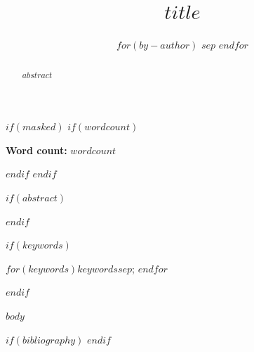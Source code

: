 \documentclass[
    a4paper,
    man,
    floatsintext
]{glossaPX2}
\title[$shorttitle$]{$title$}
\author[]{}%
\author[$if(shortauthor)$$shortauthor$$endif$]{
  $for(by-author)$
  \spauthor{
  $by-author.name.literal$\\
  $if(by-author.affiliations)$
    $for(by-author.affiliations)$
      \institute{$by-author.affiliations.name$}\\
    $endfor$
  $endif$
  $if(by-author.email)$
    \small{$by-author.email$\\}
  $endif$
  $if(by-author.orcid)$
    \small{ORCID: $by-author.orcid$}
  $endif$
  }
  $sep$ \AND
  $endfor$
  }
\begin{document}
\maketitle

$if(masked)$
  $if(wordcount)$
\begin{center}
\textbf{Word count:} $wordcount$
\end{center}
  $endif$
$endif$

$if(abstract)$
\begin{abstract}
$abstract$
\end{abstract}
$endif$

$if(keywords)$
\begin{keywords}
$for(keywords)$$keywords$$sep$; $endfor$
\end{keywords}
$endif$

$body$

$if(bibliography)$
\printbibliography
$endif$
\end{document}
